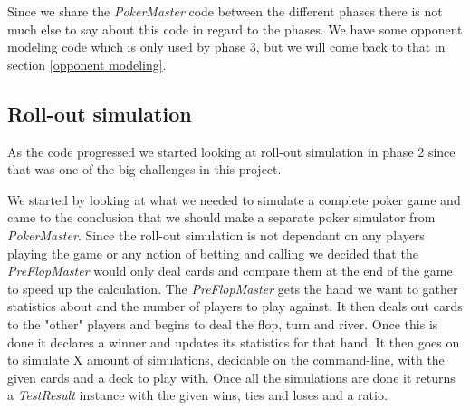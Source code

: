 \documentclass[titlepage, a4paper]{article}
\begin{document}
Since we share the \textit{PokerMaster} code between the different phases there
is not much else to say about this code in regard to the phases. We have some
opponent modeling code which is only used by phase 3, but we will come back to that
in section \ref{opponent modeling}.

\subsection{Roll-out simulation}\label{roll-out simulation}
As the code progressed we started looking at roll-out simulation in phase 2 since
that was one of the big challenges in this project.

We started by looking at what we needed to simulate a complete poker game and came
to the conclusion that we should make a separate poker simulator from \textit{PokerMaster}.
Since the roll-out simulation is not dependant on any players playing the game
or any notion of betting and calling we decided that the \textit{PreFlopMaster}
would only deal cards and compare them at the end of the game to speed up the 
calculation. The \textit{PreFlopMaster} gets the hand we want to gather statistics
about and the number of players to play against. It then deals out cards to the
"other" players and begins to deal the flop, turn and river. Once this is done
it declares a winner and updates its statistics for that hand. It then goes on to
simulate X amount of simulations, decidable on the command-line, with the given cards
and a deck to play with. Once all the simulations are done it returns a
\textit{TestResult} instance with the given wins, ties and loses and a ratio.
\end{document}
